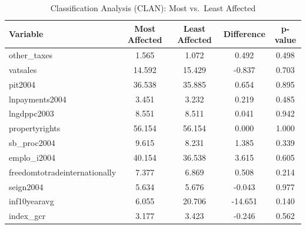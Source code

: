 \begin{table}[h]
\centering
\caption{Classification Analysis (CLAN): Most vs.\ Least Affected}
\label{tab:clan}
\begin{tabular}{lcccc}
\toprule
Variable & Most Affected & Least Affected & Difference & p-value \\
\midrule
other\_taxes & 1.565 & 1.072 & 0.492 & 0.498 \\
vatsales & 14.592 & 15.429 & -0.837 & 0.703 \\
pit2004 & 36.538 & 35.885 & 0.654 & 0.895 \\
lnpayments2004 & 3.451 & 3.232 & 0.219 & 0.485 \\
lngdppc2003 & 8.551 & 8.511 & 0.041 & 0.942 \\
propertyrights & 56.154 & 56.154 & 0.000 & 1.000 \\
sb\_proc2004 & 9.615 & 8.231 & 1.385 & 0.339 \\
emplo\_i2004 & 40.154 & 36.538 & 3.615 & 0.605 \\
freedomtotradeinternationally & 7.377 & 6.869 & 0.508 & 0.214 \\
seign2004 & 5.634 & 5.676 & -0.043 & 0.977 \\
inf10yearavg & 6.055 & 20.706 & -14.651 & 0.140 \\
index\_gcr & 3.177 & 3.423 & -0.246 & 0.562 \\
\bottomrule
\end{tabular}
\end{table}